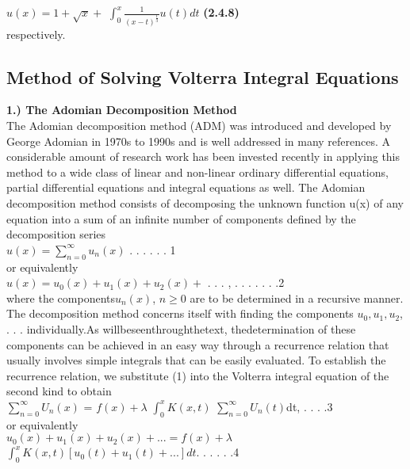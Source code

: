 \documentclass[12pt]{article}
\begin{document}
$u(x) = 1 + \sqrt{x} +$ \(\int_{0}^{x} \frac{1}{(x - t)^\frac{1}{3}} u(t)dt\)		\textbf{(2.4.8)}\\

respectively.
\subsection{Method of Solving Volterra Integral Equations}
\textbf{1.)	The Adomian Decomposition Method}\\
The Adomian decomposition method (ADM) was introduced and developed by George Adomian in 1970s to 1990s and is well addressed in many references. A considerable amount of research work has been invested recently in applying this method to a wide class of linear and non-linear ordinary differential equations, partial differential equations and integral equations as well. The Adomian decomposition method consists of decomposing the unknown function u(x) of any equation into a sum of an infinite number of components defined by the decomposition series\\

$u(x) = \sum_{n=0}^{\infty}  u_n(x)$			. . . . . . 1\\

or equivalently\\

$u(x) = u_0(x) + u_1(x) + u_2(x) +$ . . . ,		. . . . . . .2\\

where the components$ u_n(x)$, $n\geq 0$ are to be determined  in a recursive manner. The decomposition method concerns itself with ﬁnding the components $u_0, u_1, u_2$, . . . individually.As willbeseenthroughthetext, thedetermination of these components can be achieved in an easy way through a recurrence relation that usually involves simple integrals that can be easily evaluated.
To establish the recurrence relation, we substitute (1) into the Volterra integral equation of the second kind to obtain\\

\(\sum_{n=0}^{\infty} U_{n}(x)\) = $f(x) + \lambda$ \(\int_{0}^{x} K(x,t)\) \(\sum_{n=0}^{\infty} U_{n}(t)\)dt,	. . . .3\\

or equivalently\\

$u_0(x) + u_1(x) + u_2(x) + . . . = f(x) + \lambda$ \(\int_{0}^{x} K(x,t) [u_0(t) + u_1(t) + . . .]dt\).		. . .  . .4\\
\end{document}
